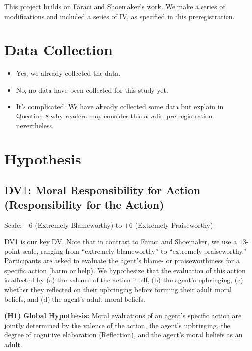 \documentclass[scrarticle]{scrartcl}
\begin{document}
This project builds on Faraci and Shoemaker's work.
We make a series of modifications and included a series of IV, as specified in this preregistration.


\section{Data Collection}
\begin{itemize}[label=\Square,noitemsep]
   \item Yes, we already collected the data.
   \item[\XBox] No, no data have been collected for this study yet.
   \item It's complicated. We have already collected some data but explain in Question $8$ why readers may consider this a valid pre-registration nevertheless.
\end{itemize}


\section{Hypothesis}


\subsection*{DV1: Moral Responsibility for Action (Responsibility for the Action)}
Scale: $-6$ (Extremely Blameworthy) to $+6$ (Extremely Praiseworthy)

\vspace{0.75em}
\noindent DV1 is our key DV.
Note that in contrast to Faraci and Shoemaker, we use a $13$-point scale, ranging from \enquote{extremely blameworthy} to \enquote{extremely praiseworthy.}
Participants are asked to evaluate the agent's blame- or praiseworthiness for a specific action (harm or help).
We hypothesize that the evaluation of this action is affected by (a) the valence of the action itself, (b) the agent's upbringing, (c) whether they reflected on their upbringing before forming their adult moral beliefs, and (d) the agent's adult moral beliefs.

\vspace{0.75em}
\noindent \textsf{\textbf{(H1) Global Hypothesis:}}
Moral evaluations of an agent's specific action are jointly determined by the valence of the action, the agent's upbringing, the degree of cognitive elaboration (Reflection), and the agent's moral beliefs as an adult.
\end{document}
